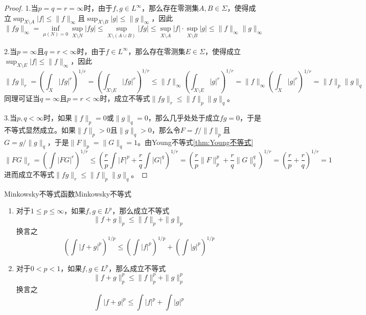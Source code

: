 \documentclass[lang = cn, scheme = chinese, thmcnt = section]{elegantbook}
\begin{document}
\begin{proof}
	1.当$p=q=r=\infty$时，由于$f,g\in L^{\infty}$，那么存在零测集$A,B\in\Sigma$，使得成立$\displaystyle\sup_{X\setminus A}|f|\le \|f\|_{\infty}$且$\displaystyle\sup_{X\setminus B}|g|\le \|g\|_{\infty}$，因此
	$$
	\|fg\|_\infty=\inf_{\mu(N)=0}\sup_{X\setminus N}|fg|\le \sup_{X\setminus(A\cup B)}|fg|\le\sup_{X\setminus A}|f|\cdot\sup_{X\setminus B}|g|\le\|f\|_\infty\|g\|_\infty
	$$
	
	2.当$p=\infty$且$q=r<\infty$时，由于$f\in L^\infty$，那么存在零测集$E\in\Sigma$，使得成立$\displaystyle\sup_{X\setminus E}|f|\le \|f\|_{\infty}$，因此
	$$
	\|fg\|_r
	=\left( \int_{X}|fg|^r \right)^{1/r}
	=\left( \int_{X\setminus E}|fg|^r \right)^{1/r}
	\le \|f\|_\infty \left( \int_{X\setminus E}|g|^r \right)^{1/r}
	=\|f\|_\infty \left( \int_{X}|g|^r \right)^{1/r}
	=\|f\|_p \|g\|_q
	$$
	同理可证当$q=\infty$且$p=r<\infty$时，成立不等式$\| fg \|_r\le\|f\|_p \|g\|_q$。
	
	3.当$p,q<\infty$时，如果$\|f\|_p=0$或$\|g\|_q=0$，那么几乎处处于成立$fg=0$，于是不等式显然成立。如果$\|f\|_p>0$且$\|g\|_q>0$，那么令$F=f/\|f\|_p$且$G=g/\|g\|_q$，于是$\|F\|_p=\|G\|_q=1$。由Young不等式\ref{thm:Young不等式}
	$$
	\|FG\|_r=
	\left(\int|FG|^r\right)^{1/r}
	\le\left(\frac{r}{p}\int|F|^p+\frac{r}{q}\int|G|^q\right)^{1/r}
	=\left(\frac{r}{p}\|F\|_p^p+\frac{r}{q}\|G\|_q^q\right)^{1/r}
	=\left(\frac{r}{p}+\frac{r}{q}\right)^{1/r}=1
	$$
	进而成立不等式$\| fg \|_r\le\|f\|_p \|g\|_q$。
\end{proof}

\begin{theorem}{Minkowsky不等式}{函数Minkowsky不等式}
	\begin{enumerate}
		\item 对于$1\le p \le\infty$，如果$f,g\in L^p$，那么成立不等式
		$$
		\|f+g\|_p\le\|f\|_p+\|g\|_p
		$$
		换言之
		$$
		\left(\int |f+g|^p\right)^{1/p}
		\le \left(\int |f|^p\right)^{1/p}+\left(\int |g|^p\right)^{1/p}
		$$
		\item 对于$0<p<1$，如果$f,g\in L^p$，那么成立不等式
		$$
		\|f+g\|_p^p\le\|f\|_p^p+\|g\|_p^p
		$$
		换言之
		$$
		\int |f+g|^p\le \int |f|^p+\int |g|^p
		$$
	\end{enumerate}
\end{theorem}
\end{document}
